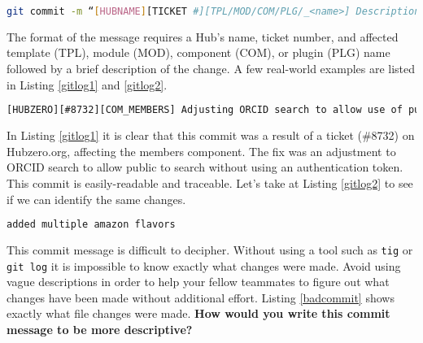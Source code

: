 \documentclass[10pt,letterpaper,titlepage]{article}
\begin{document}
\begin{lstlisting}[caption={Style for commit messages used in HubZERO web development.},language=Bash,label=gitcommit]
git commit -m “[HUBNAME][TICKET #][TPL/MOD/COM/PLG/_<name>] Description of change”]
\end{lstlisting}

The format of the message requires a Hub's name, ticket number, and affected template (TPL), module (MOD), component (COM), or plugin (PLG) name followed by a brief description of the change.
A few real-world examples are listed in Listing \ref{gitlog1} and \ref{gitlog2}.

\begin{lstlisting}[caption={An exammple of a git commit message following the standard format.},language=Bash,label=gitlog1]
[HUBZERO][#8732][COM_MEMBERS] Adjusting ORCID search to allow use of public search without auth token
\end{lstlisting}

In Listing \ref{gitlog1} it is clear that this commit was a result of a ticket (\#8732) on Hubzero.org, affecting the members component. The fix was an adjustment to ORCID search to allow
public to search without using an authentication token. This commit is easily-readable and traceable. Let's take at Listing \ref{gitlog2} to see if we can identify the same changes.

\begin{lstlisting}[caption={Style for commit messages used in HubZERO web development.},language=Bash,label=gitlog2]
added multiple amazon flavors
\end{lstlisting}

This commit message is difficult to decipher. Without using a tool such as \texttt{tig} or \texttt{git log} it is impossible to know exactly what changes were made. Avoid using vague descriptions in order to
help your fellow teammates to figure out what changes have been made without additional effort. Listing \ref{badcommit} shows exactly what file changes were made. \textbf{How would you write this commit message to be more descriptive?}
\end{document}
